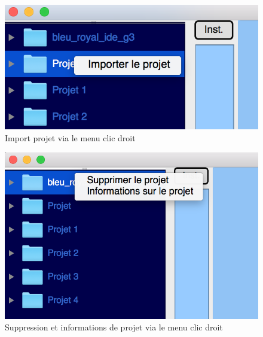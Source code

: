\documentclass[a4paper,12pt]{article}
\begin{document}
\newpage

\begin{figure}[h!]
			\begin{center}
				\includegraphics[scale=0.5]{images/right_click_import.png}
				\caption{Import projet via le menu clic droit}
			\end{center}
		\end{figure}
		
\begin{figure}[h!]
			\begin{center}
				\includegraphics[scale=0.5]{images/right_click_project.png}
				\caption{Suppression et informations de projet via le menu clic droit}
			\end{center}
		\end{figure}
		
\end{document}
